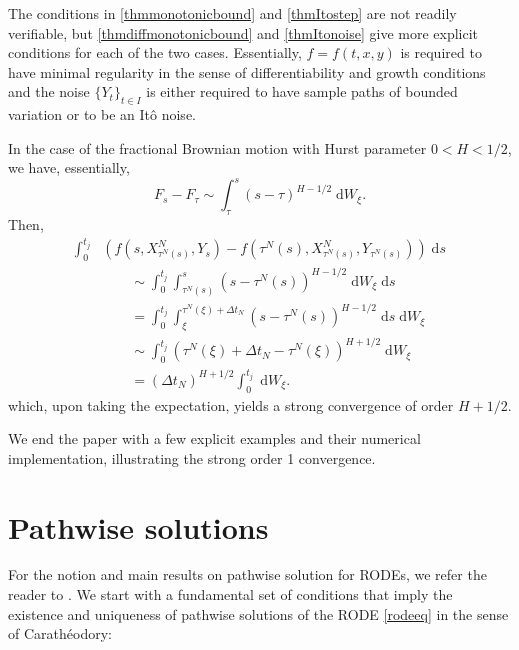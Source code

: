 \documentclass[reqno,12pt]{amsart}
\theoremstyle{plain}%
\theoremstyle{definition}
\begin{document}
The conditions in \cref{thmmonotonicbound} and \cref{thmItostep} are not readily verifiable, but \cref{thmdiffmonotonicbound} and \cref{thmItonoise} give more explicit conditions for each of the two cases. Essentially, $f=f(t, x, y)$ is required to have minimal regularity in the sense of differentiability and growth conditions and the noise $\{Y_t\}_{t\in I}$ is either required to have sample paths of bounded variation or to be an It\^o noise.

In the case of the fractional Brownian motion with Hurst parameter $0 < H < 1/2$, we have, essentially,
\[
    F_s - F_\tau \sim \int_\tau^s (s-\tau)^{H-1/2}\;\mathrm{d}W_\xi.
\]
Then,
\begin{align*}
    \int_0^{t_j} & \left( f(s, X_{\tau^N(s)}^N, Y_s) - f(\tau^N(s), X_{\tau^N(s)}^N, Y_{\tau^N(s)}) \right)\;\mathrm{d}s \\ 
    & \qquad \sim \int_0^{t_j} \int_{\tau^N(s)}^s (s-\tau^N(s))^{H-1/2} \;\mathrm{d} W_\xi\;\mathrm{d}s \\
    & \qquad = \int_0^{t_j} \int_{\xi}^{\tau^N(\xi) + \Delta t_N} (s-\tau^N(s))^{H-1/2} \;\mathrm{d}s \;\mathrm{d} W_\xi \\
    & \qquad \sim \int_0^{t_j} (\tau^N(\xi) + \Delta t_N - \tau^N(\xi))^{H+1/2} \;\mathrm{d} W_\xi \\
    & \qquad = (\Delta t_N)^{H+1/2} \int_0^{t_j} \;\mathrm{d} W_\xi.
\end{align*}
which, upon taking the expectation, yields a strong convergence of order $H+1/2$.

We end the paper with a few explicit examples and their numerical implementation, illustrating the strong order 1 convergence.

\section{Pathwise solutions}
\label{secpathwisesolution}

For the notion and main results on pathwise solution for RODEs, we refer the reader to \cite[Section 2.1]{HanKloeden2017}. We start with a fundamental set of conditions that imply the existence and uniqueness of pathwise solutions of the RODE \eqref{rodeeq} in the sense of Carath\'eodory:
\end{document}
